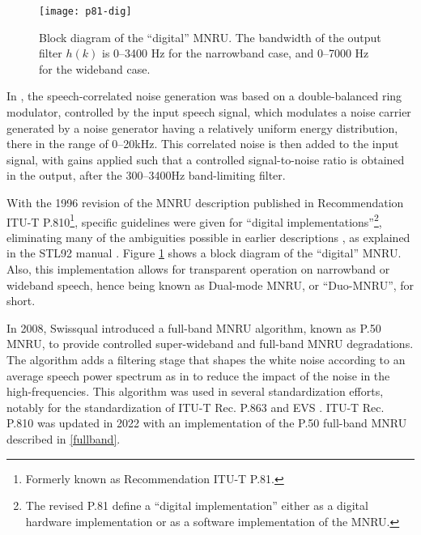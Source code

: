  \begin{figure}[hpbt]
  \begin{center}
    \texttt{[image: p81-dig]}
  \end{center}
  \caption{Block diagram of the ``digital'' MNRU. The bandwidth of the output filter $h(k)$ is 0--3400 Hz for the
  narrowband case, and 0--7000 Hz for the wideband case. \label{1/P.810}}
 \end{figure}

In \cite{Q001.02.04.02}, the speech-correlated noise generation was based on a double-balanced ring modulator,
controlled by the input speech signal, which modulates a noise carrier generated by a noise generator having a
relatively uniform energy distribution, there in the range of 0--20kHz.
This correlated noise is then added to the input signal, with gains applied such that a controlled signal-to-noise
ratio is obtained in the output, after the 300--3400Hz band-limiting filter.

With the 1996 revision of the MNRU description published in Recommendation ITU-T P.810\footnote{\SF Formerly known as
Recommendation ITU-T P.81.}, specific
guidelines were given for ``digital implementations''\footnote{\SF The revised
P.81 define a ``digital implementation'' either as a digital hardware implementation or as a software implementation of
the MNRU.}, eliminating many of the ambiguities
possible in earlier descriptions \cite{Old-P.81}, as explained in the STL92 manual
\cite[Chapter 8]{STL92-Manual}. Figure \ref{1/P.810} shows a block diagram of the ``digital'' MNRU.
Also, this implementation allows for transparent operation on narrowband or wideband speech, hence being known as
Dual-mode MNRU, or ``Duo-MNRU'', for short.

In 2008, Swissqual introduced a full-band MNRU algorithm, known as P.50 MNRU, to provide controlled super-wideband and
full-band MNRU degradations.
The algorithm adds a filtering stage that shapes the white noise according to an average speech power spectrum as
in \cite{P.50} to reduce the impact of the noise in the high-frequencies.
This algorithm was used in several standardization efforts, notably for the standardization of ITU-T Rec. P.863 \cite{P.863}
and EVS \cite{EVS}.
ITU-T Rec. P.810 was updated in 2022 with an implementation of the P.50 full-band MNRU described in \ref{fullband}.

